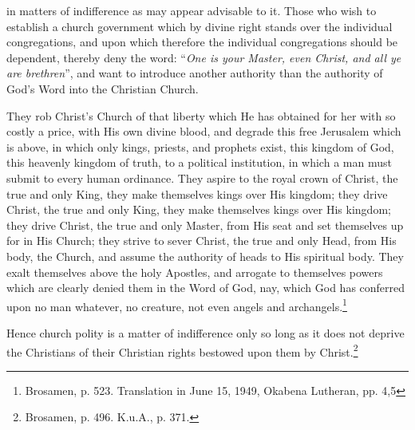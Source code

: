 in matters of indifference as may appear advisable to it.  Those who wish to establish a church government which by divine right stands over the individual congregations, and upon which therefore the individual congregations should be dependent, thereby deny the word: “\textit{One is your Master, even Christ, and all ye are brethren}”, and want to introduce another authority than the authority of God’s Word into the Christian Church.

                \begin{fancyquotes}They rob Christ’s Church of that liberty which He has obtained for her with so costly a price, with His own divine blood, and degrade this free Jerusalem which is above, in which only kings, priests, and prophets exist, this kingdom of God, this heavenly kingdom of truth, to a political institution, in which a man must submit to every human ordinance.  They aspire to the royal crown of Christ, the true and only King, they make themselves kings over His kingdom; they drive Christ, the true and only King, they make themselves kings over His kingdom; they drive Christ, the true and only Master, from His seat and set themselves up for in His Church; they strive to sever Christ, the true and only Head, from His body, the Church, and assume the authority of heads to His spiritual body.  They exalt themselves above the holy Apostles, and arrogate to themselves powers which are clearly denied them in the Word of God, nay, which God has conferred upon no man whatever, no creature, not even angels and archangels.\footnote{Brosamen, p. 523. Translation in June 15, 1949, Okabena Lutheran, pp. 4,5}\end{fancyquotes}  Hence church polity is a matter of indifference only so long as it does not deprive the Christians of their Christian rights bestowed upon them by Christ.\footnote{Brosamen, p. 496. K.u.A., p. 371.}

